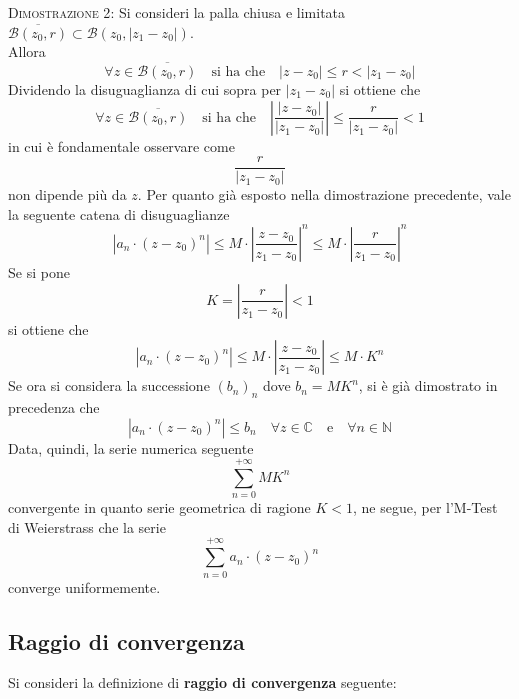 \documentclass[a4paper]{extarticle}
\begin{document}
\vspace{2em}
\noindent
\normalfont \normalsize
\textsc{Dimostrazione 2}: Si consideri la palla chiusa e limitata $\overline{\mathcal{B}(z_0,r)} \subset \mathcal{B}(z_0, \vert z_1-z_0 \vert)$.\\
Allora
\[\forall z \in \overline{\mathcal{B}(z_0,r)} \hspace{1em} \text{si ha che} \hspace{1em} \left \vert z - z_0 \right \vert \leq r < \left \vert z_1 -z_0 \right \vert\]
Dividendo la disuguaglianza di cui sopra per $\left \vert z_1 - z_0 \right \vert$ si ottiene che
\[\forall z \in \overline{\mathcal{B}(z_0,r)} \hspace{1em} \text{si ha che} \hspace{1em} \left \vert \frac{\left \vert z - z_0 \right \vert}{\left \vert z_1 - z_0 \right \vert} \right \vert \leq \frac{r}{\left \vert z_1 - z_0 \right \vert} < 1\]
in cui è fondamentale osservare come
\[\frac{r}{\left \vert z_1 - z_0 \right \vert}\]
non dipende più da $z$. Per quanto già esposto nella dimostrazione precedente, vale la seguente catena di disuguaglianze
\[\left \vert a_n \cdot (z-z_0)^n \right \vert \leq M \cdot \left \vert \frac{z-z_0}{z_1-z_0}\right \vert^n \leq M \cdot \left \vert \frac{r}{z_1 - z_0} \right \vert ^n\]
Se si pone
\[K = \left \vert \frac{r}{z_1-z_0} \right \vert < 1\]
si ottiene che
\[\left \vert a_n \cdot (z-z_0)^n \right \vert \leq M \cdot \left \vert \frac{z-z_0}{z_1-z_0} \right \vert \leq M \cdot K^n\]
Se ora si considera la successione $(b_n)_n$ dove $b_n=M K^n$, si è già dimostrato in precedenza che
\[\left \vert a_n \cdot (z-z_0)^n \right \vert \leq b_n \hspace{1em} \forall z \in \mathbb{C} \hspace{1em} \text{e} \hspace{1em} \forall n \in \mathbb{N}\]
Data, quindi, la serie numerica seguente
\[\sum_{n=0}^{+\infty} M K^n\]
convergente in quanto serie geometrica di ragione $K<1$, ne segue, per l'M-Test di Weierstrass che la serie
\[\sum_{n=0}^{+\infty} a_n \cdot (z-z_0)^n\]
converge uniformemente.

\newpage
\noindent
\subsection{Raggio di convergenza}
Si consideri la definizione di \textbf{raggio di convergenza} seguente:
\end{document}
